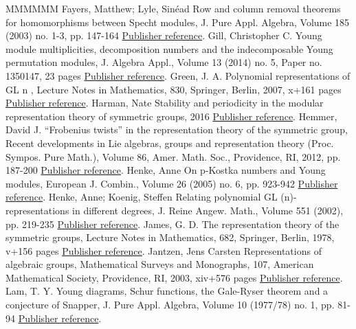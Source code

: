 \begin{thebibliography}{MMMMMM}
 Fayers, Matthew; Lyle, Sinéad Row and column removal theorems for homomorphisms between Specht modules, J. Pure Appl. Algebra, Volume 185 (2003) no. 1-3, pp. 147-164 \href{https://alco.centre-mersenne.org/articles/10.5802/alco.397/#FL}{Publisher reference}.
 Gill, Christopher C. Young module multiplicities, decomposition numbers and the indecomposable Young permutation modules, J. Algebra Appl., Volume 13 (2014) no. 5, Paper no. 1350147, 23 pages \href{https://alco.centre-mersenne.org/articles/10.5802/alco.397/#Gi}{Publisher reference}.
 Green, J. A. Polynomial representations of  GL  n , Lecture Notes in Mathematics, 830, Springer, Berlin, 2007, x+161 pages \href{https://alco.centre-mersenne.org/articles/10.5802/alco.397/#Gr}{Publisher reference}.
 Harman, Nate Stability and periodicity in the modular representation theory of symmetric groups, 2016 \href{https://alco.centre-mersenne.org/articles/10.5802/alco.397/#Ha}{Publisher reference}.
 Hemmer, David J. “Frobenius twists” in the representation theory of the symmetric group, Recent developments in Lie algebras, groups and representation theory (Proc. Sympos. Pure Math.), Volume 86, Amer. Math. Soc., Providence, RI, 2012, pp. 187-200 \href{https://alco.centre-mersenne.org/articles/10.5802/alco.397/#Hem2}{Publisher reference}.
 Henke, Anne On p-Kostka numbers and Young modules, European J. Combin., Volume 26 (2005) no. 6, pp. 923-942 \href{https://alco.centre-mersenne.org/articles/10.5802/alco.397/#Hen}{Publisher reference}.
 Henke, Anne; Koenig, Steffen Relating polynomial  GL (n)-representations in different degrees, J. Reine Angew. Math., Volume 551 (2002), pp. 219-235 \href{https://alco.centre-mersenne.org/articles/10.5802/alco.397/#HK}{Publisher reference}.
 James, G. D. The representation theory of the symmetric groups, Lecture Notes in Mathematics, 682, Springer, Berlin, 1978, v+156 pages \href{https://alco.centre-mersenne.org/articles/10.5802/alco.397/#Jam}{Publisher reference}.
 Jantzen, Jens Carsten Representations of algebraic groups, Mathematical Surveys and Monographs, 107, American Mathematical Society, Providence, RI, 2003, xiv+576 pages \href{https://alco.centre-mersenne.org/articles/10.5802/alco.397/#Jan}{Publisher reference}.
 Lam, T. Y. Young diagrams, Schur functions, the Gale-Ryser theorem and a conjecture of Snapper, J. Pure Appl. Algebra, Volume 10 (1977/78) no. 1, pp. 81-94 \href{https://alco.centre-mersenne.org/articles/10.5802/alco.397/#Lam}{Publisher reference}.

\end{thebibliography}
